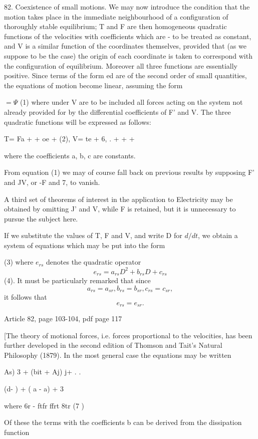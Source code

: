 82. Coexistence of small motions.
We may now introduce the condition that the motion takes place in the
immediate neighbourhood of a configuration of thoroughly stable equilibrium;
T and F are then homogeneous quadratic functions of the velocities with
coefficients which are - to be treated as constant, and V is a similar function
of the coordinates themselves, provided that (as we suppose to be the case) the
origin of each coordinate is taken to correspond with the configuration of
equilibrium. Moreover all three functions are essentially positive. Since terms
of the form ed are of the second order of small quantities, the equations of
motion become linear, assuming the form

\(= \Psi\) (1) where under V are to be included all forces acting on the system not
already provided for by the differential coefficients of F' and V.  The three
quadratic functions will be expressed as follows:

T= Fa + + oe + (2), V= te + 6, . + + +

where the coefficients a, b, c are constants.

From equation (1) we may of course fall back on previous results by supposing
F' and JV, or -F and 7, to vanish.

A third set of theorems of interest in the application to Electricity may be
obtained by omitting J' and V, while F is retained, but it is unnecessary to
pursue the subject here.

If we substitute the values of T, F and V, and write D for \(d/dt\), we obtain
a system of equations which may be put into the form

(3) where \(e_{rs}\) denotes the quadratic operator
\[ e_{rs}= a_{rs}D^2+ b_{rs}D+ c_{rs} \]
 (4). It must be particularly remarked that since
\[ a_{rs}= a_{sr}, b_{rs}= b_{sr}, c_{rs}= c_{sr}, \]
it follows that
\[ e_{rs}=e_{sr}.  \]

Article 82, page 103-104, pdf page 117

[The theory of motional forces, i.e. forces proportional to the velocities, has
been further developed in the second edition of Thomson and Tait's Natural
Philosophy (1879). In the most general case the equations may be written

  As)  3 + (bit + Aj) j+ . .

 (d- )   + ( a - a) +     3

where 6r - ftfr ffrt  8tr (7 )

Of these the terms with the coefficients b can be derived from the dissipation
function

